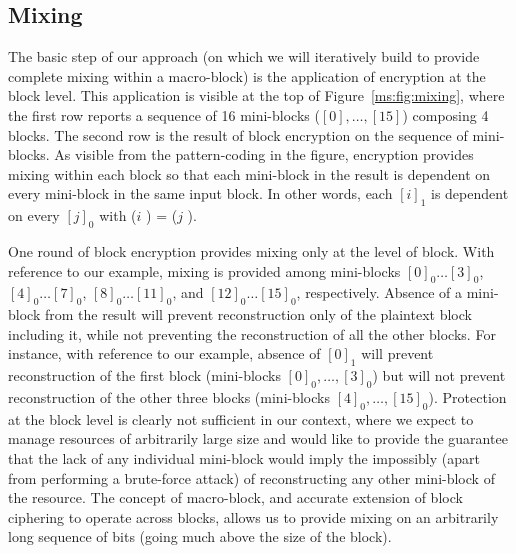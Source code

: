 \subsection{Mixing}

The basic step of our approach (on which we will iteratively build to provide complete mixing within a macro-block) is the application of encryption at the block level. This application is visible at the top of Figure~\ref{ms:fig:mixing}, where the first row reports a sequence of 16 mini-blocks ($[0],\ldots,[15]$) composing 4 blocks. The second row is the result of block encryption on the sequence of mini-blocks. As visible from the pattern-coding in the figure, encryption provides mixing within each block so that each mini-block in the result is dependent on every mini-block in the same input block. In other words, each $[i]_1$ is dependent on every $[j]_0$ with ($i$ ) = ($j$ ).

One round of block encryption provides mixing only at the level of block. With reference to our example, mixing is provided among mini-blocks $[0]_0 \ldots [3]_0$, $[4]_0 \ldots [7]_0$, $[8]_0 \ldots [11]_0$, and $[12]_0 \ldots [15]_0$, respectively. Absence of a mini-block from the result will prevent reconstruction only of the plaintext block including it, while not preventing the reconstruction of all the other blocks. For instance, with reference to our example, absence of $[0]_1$ will prevent reconstruction of the first block (mini-blocks $[0]_0, \ldots, [3]_0$) but will not prevent reconstruction of the other three blocks (mini-blocks $[4]_0, \ldots, [15]_0$). Protection at the block level is clearly not sufficient in our context, where we expect to manage resources of arbitrarily large size and would like to provide the guarantee that the lack of any individual mini-block would imply the impossibly (apart from performing a brute-force attack) of reconstructing any other mini-block of the resource. The concept of macro-block, and accurate extension of block ciphering to operate across blocks, allows us to provide mixing on an arbitrarily long sequence of bits (going much above the size of the block).

